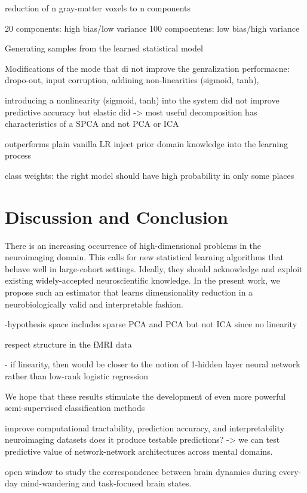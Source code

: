 \documentclass{article} %
\begin{document}
reduction of n gray-matter voxels to n components


20 components: high bias/low variance
100 compoentens: low bias/high variance

Generating samples from the learned statistical model



Modifications of the mode that di not improve the genralization performacne:
dropo-out, input corruption, addining non-linearities (sigmoid, tanh),


introducing a
nonlinearity (sigmoid, tanh) into the system did not improve predictive accuracy but
elastic did -> most useful decomposition has characteristics of a SPCA
and not PCA or ICA

outperforms plain vanilla LR
inject prior domain knowledge into the learning process


class weights:
the right model should have high probability in only some places





\section{Discussion and Conclusion}
%
There is an increasing occurrence of high-dimensional problems in the
neuroimaging domain. This calls for new statistical learning algorithms that
behave well in large-cohort settings. Ideally, they should acknowledge
and exploit existing widely-accepted neuroscientific knowledge.
In the present work, we propose such an estimator that learns
dimensionality reduction
in a neurobiologically valid and interpretable fashion.

-hypothesis space includes sparse PCA and PCA but not ICA since no
linearity

respect structure in the fMRI data


- if linearity, then would be closer to the notion of 1-hidden layer neural
network rather than low-rank logistic regression



We hope that these results stimulate the development of
even more powerful semi-supervised classification methods


improve computational tractability, prediction accuracy, and interpretability
neuroimaging datasets
does it produce testable predictions?
-> we can test predictive value of network-network architectures across
mental domains.

open window to study the correspondence between brain dynamics during
every-day mind-wandering and task-focused brain states.
\end{document}
